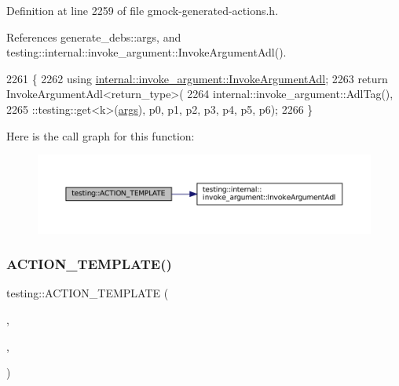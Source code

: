 Definition at line 2259 of file gmock-\/generated-\/actions.\+h.



References generate\+\_\+debs\+::args, and testing\+::internal\+::invoke\+\_\+argument\+::\+Invoke\+Argument\+Adl().


\begin{DoxyCode}
2261                                                                 \{
2262   \textcolor{keyword}{using} \hyperlink{namespacetesting_1_1internal_1_1invoke__argument_abd36164191a3e386c50243074854b272}{internal::invoke\_argument::InvokeArgumentAdl};
2263   \textcolor{keywordflow}{return} InvokeArgumentAdl<return\_type>(
2264       internal::invoke\_argument::AdlTag(),
2265       ::testing::get<k>(\hyperlink{namespacegenerate__debs_a75f9143e38df82d83b2e8a6f99cae02c}{args}), p0, p1, p2, p3, p4, p5, p6);
2266 \}
\end{DoxyCode}
Here is the call graph for this function\+:
\nopagebreak
\begin{figure}[H]
\begin{center}
\leavevmode
\includegraphics[width=350pt]{namespacetesting_a8d3590561f334d165c620f522219831b_cgraph}
\end{center}
\end{figure}
\mbox{\label{namespacetesting_a8725892aafb62cc8f6f76280d29595d8}} 
\subsubsection{\texorpdfstring{A\+C\+T\+I\+O\+N\+\_\+\+T\+E\+M\+P\+L\+A\+T\+E()}{ACTION\_TEMPLATE()}\hspace{0.1cm}{\footnotesize\ttfamily [15/28]}}
{\footnotesize\ttfamily testing\+::\+A\+C\+T\+I\+O\+N\+\_\+\+T\+E\+M\+P\+L\+A\+TE (\begin{DoxyParamCaption}\item[{Invoke\+Argument}]{,  }\item[{H\+A\+S\+\_\+1\+\_\+\+T\+E\+M\+P\+L\+A\+T\+E\+\_\+\+P\+A\+R\+A\+MS(int, k)}]{,  }\item[{A\+N\+D\+\_\+8\+\_\+\+V\+A\+L\+U\+E\+\_\+\+P\+A\+R\+A\+MS(p0, p1, p2, p3, p4, p5, p6, p7)}]{ }\end{DoxyParamCaption})}



